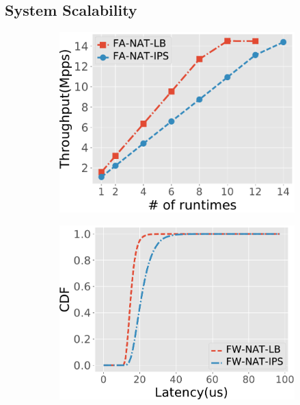
\subsection{System Scalability}
\label{sec:ppt}

\begin{figure}[!h]
  \begin{subfigure}[t]{0.49\linewidth}
    \centering
    \includegraphics[width=\columnwidth]{chap-nfvactor/exp-figure/throughput_scaling.pdf}
    \caption{}\label{fig:throughput_scaling}
  \end{subfigure}\hfill
  \begin{subfigure}[t]{0.49\linewidth}
   \centering
   \includegraphics[width=\columnwidth]{chap-nfvactor/exp-figure/throughput_latency_cdf.pdf}

\end{subfigure}
\end{figure}
